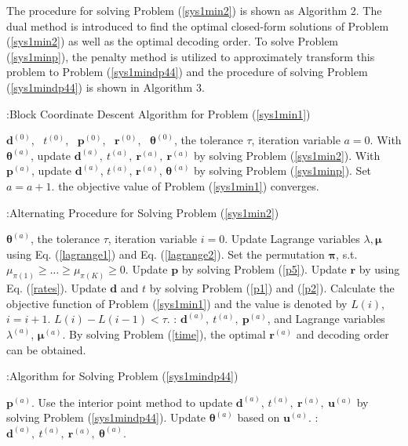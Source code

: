 \documentclass[journal]{IEEEtran}
\begin{document}
The procedure for solving Problem (\ref{sys1min2}) is shown as Algorithm 2. The dual method is introduced to find the optimal closed-form solutions of Problem (\ref{sys1min2}) as well as the optimal decoding order. To solve Problem (\ref{sys1minp}), the penalty method is utilized to approximately transform this problem to Problem (\ref{sys1mindp44}) and the procedure of solving Problem (\ref{sys1mindp44}) is shown in Algorithm 3.

\begin{algorithm}[h]
	\caption{:Block Coordinate Descent Algorithm for Problem (\ref{sys1min1})}
	\label{alg:Framwork1}
	\begin{algorithmic}[1]
		\STATE {} $\pmb d^{(0)}$,~ $t^{(0)}$,~ $\pmb p^{(0)}$,~ $\pmb r^{(0)}$,~ $\pmb \theta^{(0)}$, the tolerance $\tau$, iteration variable $a=0$.
		\REPEAT
		\STATE With $\pmb \theta^{(a)}$, update $\pmb d^{(a)},~t^{(a)},~ \pmb r^{(a)},~ \pmb r^{(a)}$ by solving Problem (\ref{sys1min2}).
		\STATE With $\pmb p^{(a)}$, update $\pmb d^{(a)}$, $t^{(a)}$, $\pmb r^{(a)}$, $\pmb \theta^{(a)}$ by solving Problem (\ref{sys1minp}).
        \STATE Set $a=a+1$.
		\UNTIL the objective value of Problem (\ref{sys1min1}) converges.
	\end{algorithmic}
\end{algorithm}
\begin{algorithm}[h]
	\caption{:Alternating Procedure for Solving Problem (\ref{sys1min2})}
	\label{alg:Framwork2}
	\begin{algorithmic}[1]
   \STATE {} $\pmb \theta^{(a)}$, the tolerance $\tau$, iteration variable $i=0$.
   \REPEAT
   \STATE Update Lagrange variables $\lambda, \pmb \mu$ using Eq. (\ref{lagrange1}) and Eq. (\ref{lagrange2}).
   \STATE Set the permutation $\pmb\pi$, s.t. $\mu_{\pi(1)}\geq\dots\geq\mu_{\pi(K)}\geq 0$.
   \STATE Update $\pmb p$ by solving Problem (\ref{p5}).
   \STATE Update $\pmb r$ by using Eq. (\ref{rates}).
   \STATE Update $\pmb d$ and $t$ by solving Problem (\ref{p1}) and (\ref{p2}).
   \STATE Calculate the objective function of Problem (\ref{sys1min1}) and the value is denoted by $L(i)$, $i=i+1$.
   \UNTIL $L(i)-L(i-1)<\tau$.
   \STATE {}:  $\pmb d^{(a)},~ t^{(a)},~ \pmb p^{(a)}$, and Lagrange variables $\lambda^{(a)}$, $\pmb \mu^{(a)}$. By solving Problem (\ref{time}), the optimal $\pmb r^{(a)}$ and decoding order can be obtained.
   \end{algorithmic}
\end{algorithm}
\begin{algorithm}[h]
	\caption{:Algorithm for Solving Problem (\ref{sys1mindp44})}
	\label{alg:Framwork3}
	\begin{algorithmic}[1]
		\STATE {} $\pmb p^{(a)}$.
        \STATE Use the interior point method to update $\pmb d^{(a)}$, $t^{(a)},~\pmb r^{(a)},~ \pmb u^{(a)}$ by solving Problem (\ref{sys1mindp44}).
        \STATE Update $\pmb \theta^{(a)}$ based on $\pmb u^{(a)}$.
        \STATE {}:  $\pmb d^{(a)},~t^{(a)},~\pmb r^{(a)},~\pmb \theta^{(a)}$.
	\end{algorithmic}
\end{algorithm}
\end{document}
